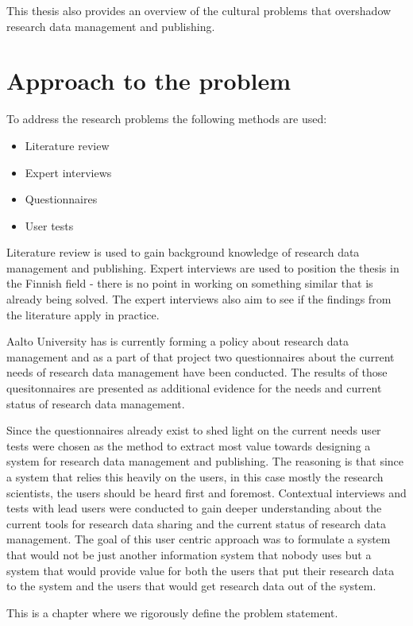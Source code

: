 This thesis also provides an overview of the cultural problems that overshadow
research data management and publishing.

\section{Approach to the problem}

To address the research problems the following methods are used:

\begin{itemize}
    \item Literature review
    \item Expert interviews
    \item Questionnaires
    \item User tests
\end{itemize}

Literature review is used to gain background knowledge of research data
management and publishing. Expert interviews are used to position the thesis
in the Finnish field - there is no point in working on something similar that
is already being solved. The expert interviews also aim to see if the findings
from the literature apply in practice.

Aalto University has is currently forming a policy about research data
management and as a part of that project two questionnaires about the
current needs of research data management have been conducted. The results of
those quesitonnaires are presented as additional evidence for the needs and
current status of research data management.

Since the questionnaires already exist to shed light on the current needs user
tests were chosen as the method to extract most value towards designing a
system for research data management and publishing. The reasoning is that since
a system that relies this heavily on the users, in this case mostly the
research scientists, the users should be heard first and foremost. Contextual
interviews and tests with lead users were conducted to gain deeper
understanding about the current tools for research data sharing and the current
status of research data management. The goal of this user centric approach was
to formulate a system that would not be just another information system that
nobody uses but a system that would provide value for both the users that
put their research data to the system and the users that would get research
data out of the system.

\iffalse
This is a chapter where we rigorously define the problem statement.

